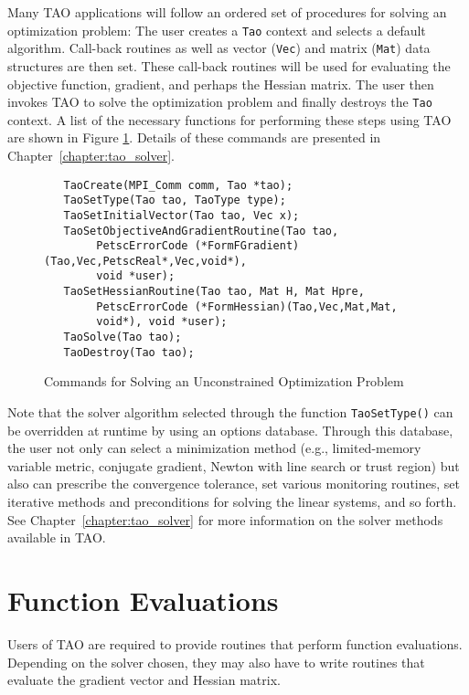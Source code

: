 Many TAO applications will follow an ordered set of procedures for 
solving an optimization problem:
The user creates a \texttt{Tao} context and selects a default algorithm. 
Call-back routines as well as vector (\texttt{Vec}) and matrix (\texttt{Mat}) 
data structures are then set.  These call-back routines will be used for 
evaluating the objective function, gradient, and perhaps the Hessian 
matrix.  The user then invokes TAO to solve the optimization problem and 
finally destroys
the \texttt{Tao} context. A list of the necessary functions for 
performing these steps
using TAO are shown in Figure \ref{fig:tao_commands}.  Details of these commands are presented in
Chapter~\ref{chapter:tao_solver}.

 
 
 
\begin{figure}[H]
\begin{verbatim}
   TaoCreate(MPI_Comm comm, Tao *tao); 
   TaoSetType(Tao tao, TaoType type);
   TaoSetInitialVector(Tao tao, Vec x);
   TaoSetObjectiveAndGradientRoutine(Tao tao, 
        PetscErrorCode (*FormFGradient)(Tao,Vec,PetscReal*,Vec,void*), 
        void *user);
   TaoSetHessianRoutine(Tao tao, Mat H, Mat Hpre,
        PetscErrorCode (*FormHessian)(Tao,Vec,Mat,Mat,
        void*), void *user);
   TaoSolve(Tao tao);
   TaoDestroy(Tao tao);
\end{verbatim}
\caption{Commands for Solving an Unconstrained Optimization Problem
\label{fig:tao_commands}}
\end{figure}

Note that the solver algorithm selected through the function 
\texttt{TaoSetType()} can be overridden
at runtime by using an options database.  Through this
database, the user not only can select a minimization method (e.g.,
limited-memory variable metric, conjugate gradient, Newton with line
search or trust region) but also can prescribe the convergence
tolerance, set various monitoring routines, set iterative methods
and preconditions for solving the linear systems, and so forth.  See 
Chapter~\ref{chapter:tao_solver} for more information on the 
solver methods available in TAO.

\section{Function Evaluations}

Users of TAO are required to provide routines that perform function
evaluations. Depending on the solver chosen, they may also have to
write routines that evaluate the gradient vector and Hessian matrix.


